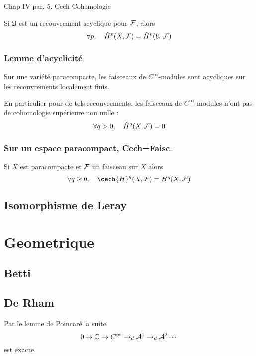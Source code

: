 \cite{Demailly} Chap IV
par. 5. Cech Cohomologie

\begin{cor}
Si $\mathfrak{U}$ est un recouvrement acyclique pour $\mathcal{F}$, alors
\begin{equation}
\forall p, \quad \check{H}^p(X,\mathcal{F}) = \check{H}^p(\mathfrak{U},\mathcal{F})
\end{equation}
\end{cor}

\subsection{Lemme d'acyclicité}
Sur une variété paracompacte, les faisceaux de $C^\infty$-modules sont acycliques sur les recouvrements localement finis.

En particulier pour de tels recouvrements, les faisceaux de $C^\infty$-modules n'ont pas de cohomologie supérieure non nulle : 
\begin{equation}
\forall q>0 , \quad \check{H}^q(X,\mathcal{F}) = 0
\end{equation}

\subsection{Sur un espace paracompact,
Cech=Faisc.}
Si $X$ est paracompacte et $\mathcal{F}$ un faisceau sur $X$ alors
\begin{equation}
\forall q \geq 0, \quad \cech{H}^q(X,\Ff) = H^q(X,\Ff)
\end{equation}

\section{Isomorphisme de Leray}

\chapter{Geometrique}

\section{Betti}

\section{De Rham}
Par le lemme de Poincaré la suite
\begin{equation}\label{ExSeq_DR}
0 \rightarrow \underline{\mathbb{C}} \rightarrow C^\infty \rightarrow_d
\mathcal{A}^1 \rightarrow_d \mathcal{A}^2 \cdots
\end{equation}
 est exacte.

